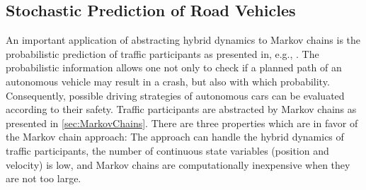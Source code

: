 \subsection{Stochastic Prediction of Road Vehicles} \label{sec:roadVehiclePrediction}

An important application of abstracting hybrid dynamics to Markov chains is the probabilistic prediction of traffic participants as presented in, e.g., \cite{Althoff2009a,Althoff2011d}. The probabilistic information allows one not only to check if a planned path of an autonomous vehicle may result in a crash, but also with which probability. Consequently, possible driving strategies of autonomous cars can be evaluated according to their safety. Traffic participants are abstracted by Markov chains as presented in \cref{sec:MarkovChains}. There are three properties which are in favor of the Markov chain approach: The approach can handle the hybrid dynamics of traffic participants, the number of continuous state variables (position and velocity) is low, and Markov chains are computationally inexpensive when they are not too large.

